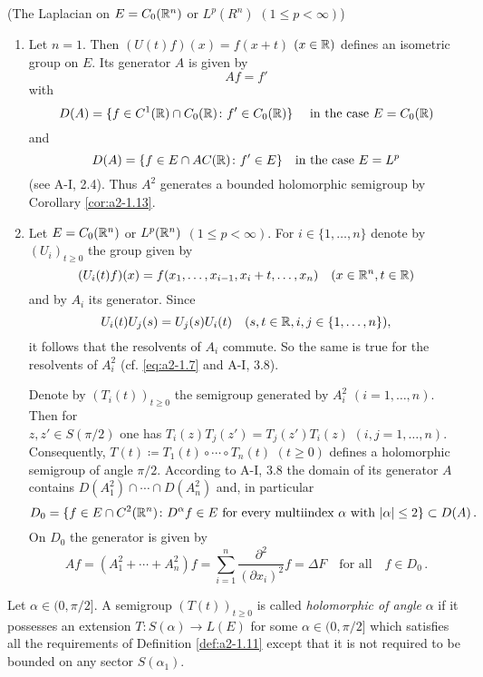 \begin{example*}\label{ex:a2-1.13-kgk}(The Laplacian on $E = C_{0}(\mathbb{R}^{n})$ or $L^{p}(R^{n})$ $(1 \leq p < \infty)$)
\begin{enumerate}[\upshape (i), wide, labelindent=.5em]
\item \label{ex:a2-1.13-kgk-1}
Let $n = 1$.
Then $(U(t)f)(x) = f(x+t)$ $(x \in \mathbb{R})$ defines an isometric group on $E$.
Its generator $A$ is given by 
\[
Af = f'
\]  
with
\[
D(A) = \{f \in C^{1}(\mathbb{R}) \cap C_{0}(\mathbb{R}) \colon f' \in C_{0}(\mathbb{R})\}
\quad \text{ in the case } E = C_{0}(\mathbb{R})
\]
and
\[
D(A) = \{f \in E \cap AC(\mathbb{R}) \colon f' \in E\} \quad \text{in the case } E = L^{p}
\] 
(see A-I, 2.4).
Thus $A^{2}$ generates a bounded holomorphic semigroup by Corollary \ref{cor:a2-1.13}. 
\item \label{ex:a2-1.13-kgk-2}
Let $E = C_{0}(\mathbb{R}^{n})$ or $L^{p}(\mathbb{R}^{n})$ $(1 \leq p < \infty)$.
For $i \in \{1,\ldots,n\}$ denote by $(U_{i})_{t \geq 0}$ the group given by 
\[
(U_{i}(t)f)(x) = f(x_{1},\ldots,x_{i-1},x_{i}+t,\ldots,x_{n}) \quad  (x \in \mathbb{R}^{n}, t \in \mathbb{R})
\]
and by $A_{i}$ its generator.
Since 
\[U_{i}(t)U_{j}(s) = U_{j}(s)U_{i}(t) \quad (s,t \in \mathbb{R}, i,j \in \{1,\ldots,n\}), 
\]
it follows that the resolvents of $A_{i}$ commute.
So the same is true for the resolvents of $A_{i}^{2}$ (cf. \eqref{eq:a2-1.7} and A-I, 3.8). 

Denote by $(T_{i}(t))_{t \geq 0}$ 
the semigroup generated by $A_{i}^{2}$ $(i=1,\ldots,n)$.
Then for \\
$z,z' \in S(\pi/2)$ one has $T_{i}(z)T_{j}(z') = T_{j}(z')T_{i}(z)$ $(i,j=1,\ldots,n)$.
Consequently, $T(t) \coloneqq T_{1}(t) \circ \cdots \circ T_{n}(t)$ $(t \geq 0)$ defines a holomorphic semigroup of angle $\pi/2$.
According to A-I, 3.8 the domain of its generator $A$ contains $D(A_{1}^{2}) \cap \cdots \cap D(A_{n}^{2})$ and, in particular
\[
D_{0} = \{f \in E \cap C^{2}(\mathbb{R}^{n}) \colon D^{\alpha}f \in E \text{ for every multiindex } \alpha \text{ with } |\alpha| \leq 2\} \subset D(A)\,.
\]
On $D_{0}$ the generator is given by
\[
    Af = (A_{1}^{2} + \cdots + A_{n}^{2})f =
    \sum_{i = 1}^{n} \frac{\partial^{2}}{(\partial x_{i})^{2}} f
    = \Delta F \quad \text{for all} \quad f \in D_{0}\,.
\]
\end{enumerate}
\end{example*}
\smallskip
Let $\alpha \in (0,\pi/2]$.
A semigroup $(T(t))_{t \geq 0}$ is called \emph{holomorphic of angle} $\alpha$ if it possesses an extension $T \colon S(\alpha) \to L(E)$ for some $\alpha \in (0,\pi/2]$ which satisfies all the requirements of Definition \ref{def:a2-1.11} except that it is not required to be bounded on any sector $S(\alpha_{1})$.
